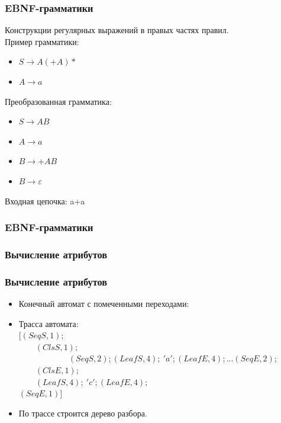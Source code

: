 \documentclass{beamer}
\begin{document}
\begin{frame}
	\transwipe[direction=90]
	\frametitle{EBNF-грамматики}
	Конструкции регулярных выражений в правых частях правил.
  \\
	Пример грамматики: 
		\begin{itemize}
			\item $S \rightarrow A(+A)*$
			\item $A \rightarrow a$
		\end{itemize}
	Преобразованная грамматика:
  \begin{itemize}
		\item $S \rightarrow AB$
		\item $A \rightarrow a$
		\item $B \rightarrow +AB$		
		\item $B \rightarrow \varepsilon$
	\end{itemize}
	Входная цепочка: a+a

\end{frame}

\begin{frame}[t]
	\transwipe[direction=90]
	\frametitle{EBNF-грамматики}
  
   
\end{frame}

\begin{frame}
	\transwipe[direction=90]
	\frametitle{Вычисление атрибутов}
  
  
\end{frame}

\begin{frame}
	\transwipe[direction=90]
	\frametitle{Вычисление атрибутов}
  \begin{itemize}
   \item
    Конечный автомат с помеченными переходами:\\
   \item
    Трасса автомата: \\
    $[(SeqS,1);$\\             
    $\phantom \qquad(ClsS,1);$\\
    $\phantom \qquad \qquad \qquad (SeqS,2); (LeafS,4); \ 'a'; (LeafE,4); ... (SeqE,2);$ \\ 
    $\phantom \qquad (ClsE,1); $\\
    $\phantom \qquad (LeafS,4); \ 'c'; (LeafE,4);$\\
    $(SeqE,1)]$
   \item
    По трассе строится дерево разбора.
  \end{itemize}
\end{frame}
\end{document}
